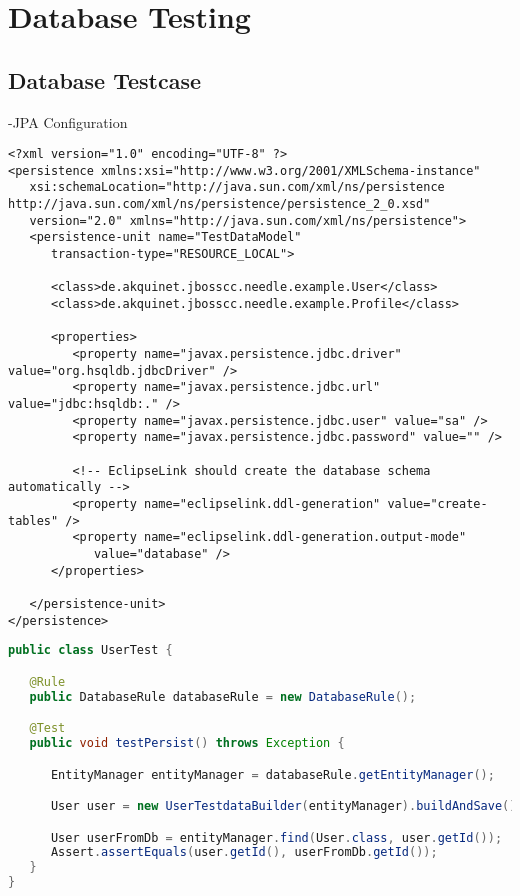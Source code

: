 \chapter{Database Testing}

\section{Database Testcase}
-JPA Configuration
\begin{lstlisting}[caption=test persistence.xml]
<?xml version="1.0" encoding="UTF-8" ?>
<persistence xmlns:xsi="http://www.w3.org/2001/XMLSchema-instance"
   xsi:schemaLocation="http://java.sun.com/xml/ns/persistence http://java.sun.com/xml/ns/persistence/persistence_2_0.xsd"
   version="2.0" xmlns="http://java.sun.com/xml/ns/persistence">
   <persistence-unit name="TestDataModel"
      transaction-type="RESOURCE_LOCAL">

      <class>de.akquinet.jbosscc.needle.example.User</class>
      <class>de.akquinet.jbosscc.needle.example.Profile</class>

      <properties>
         <property name="javax.persistence.jdbc.driver" value="org.hsqldb.jdbcDriver" />
         <property name="javax.persistence.jdbc.url" value="jdbc:hsqldb:." />
         <property name="javax.persistence.jdbc.user" value="sa" />
         <property name="javax.persistence.jdbc.password" value="" />

         <!-- EclipseLink should create the database schema automatically -->
         <property name="eclipselink.ddl-generation" value="create-tables" />
         <property name="eclipselink.ddl-generation.output-mode"
            value="database" />
      </properties>

   </persistence-unit>
</persistence>
\end{lstlisting}

\begin{lstlisting}[language={JAVA},caption=User persistence test]
public class UserTest {

   @Rule
   public DatabaseRule databaseRule = new DatabaseRule();

   @Test
   public void testPersist() throws Exception {

      EntityManager entityManager = databaseRule.getEntityManager();

      User user = new UserTestdataBuilder(entityManager).buildAndSave();

      User userFromDb = entityManager.find(User.class, user.getId());
      Assert.assertEquals(user.getId(), userFromDb.getId());
   }
}
\end{lstlisting}

